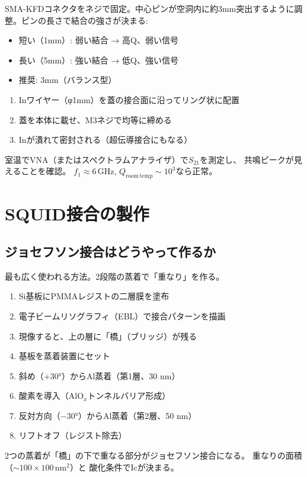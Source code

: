 \documentclass[12pt,a4paper]{article}
\begin{document}
\begin{practicebox}
SMA-KFDコネクタをネジで固定。中心ピンが空洞内に約3mm突出するように調整。ピンの長さで結合の強さが決まる:
\begin{itemize}
\item 短い（1mm）: 弱い結合 → 高Q、弱い信号
\item 長い（5mm）: 強い結合 → 低Q、強い信号
\item 推奨: 3mm（バランス型）
\end{itemize}
\end{practicebox}

\begin{practicebox}
\begin{enumerate}
\item Inワイヤー（φ1mm）を蓋の接合面に沿ってリング状に配置
\item 蓋を本体に載せ、M3ネジで均等に締める
\item Inが潰れて密封される（超伝導接合にもなる）
\end{enumerate}

室温でVNA（またはスペクトラムアナライザ）で$S_{21}$を測定し、
共鳴ピークが見えることを確認。
$f_1 \approx 6\,\mathrm{GHz}$, $Q_{\mathrm{room\,temp}} \sim 10^3$なら正常。
\end{practicebox}

\section{SQUID接合の製作}

\subsection{ジョセフソン接合はどうやって作るか}

\begin{theorybox}
最も広く使われる方法。2段階の蒸着で「重なり」を作る。

\begin{enumerate}
\item Si基板にPMMAレジストの二層膜を塗布
\item 電子ビームリソグラフィ（EBL）で接合パターンを描画
\item 現像すると、上の層に「橋」（ブリッジ）が残る
\item 基板を蒸着装置にセット
\item 斜め（+30°）からAl蒸着（第1層、30 nm）
\item 酸素を導入（AlO$_x$トンネルバリア形成）
\item 反対方向（$-30$°）からAl蒸着（第2層、50 nm）
\item リフトオフ（レジスト除去）
\end{enumerate}

2つの蒸着が「橋」の下で重なる部分がジョセフソン接合になる。
重なりの面積（$\sim 100 \times 100\,\mathrm{nm}^2$）と
酸化条件でIcが決まる。
\end{theorybox}
\end{document}
